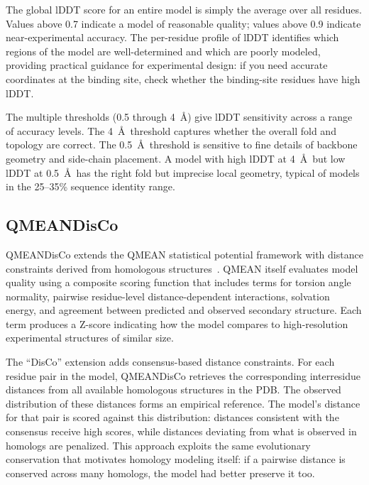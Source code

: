 The global lDDT score for an entire model is simply the average over all residues. Values above 0.7 indicate a model of reasonable quality; values above 0.9 indicate near-experimental accuracy. The per-residue profile of lDDT identifies which regions of the model are well-determined and which are poorly modeled, providing practical guidance for experimental design: if you need accurate coordinates at the binding site, check whether the binding-site residues have high lDDT.

The multiple thresholds (0.5 through 4~\AA) give lDDT sensitivity across a range of accuracy levels. The 4~\AA\ threshold captures whether the overall fold and topology are correct. The 0.5~\AA\ threshold is sensitive to fine details of backbone geometry and side-chain placement. A model with high lDDT at 4~\AA\ but low lDDT at 0.5~\AA\ has the right fold but imprecise local geometry, typical of models in the 25--35\% sequence identity range.

\subsection{QMEANDisCo}
\label{subsec:qmeandisco}

QMEANDisCo extends the QMEAN statistical potential framework with distance constraints derived from homologous structures~\cite{studer2020}. QMEAN itself evaluates model quality using a composite scoring function that includes terms for torsion angle normality, pairwise residue-level distance-dependent interactions, solvation energy, and agreement between predicted and observed secondary structure. Each term produces a Z-score indicating how the model compares to high-resolution experimental structures of similar size.

The ``DisCo'' extension adds consensus-based distance constraints. For each residue pair in the model, QMEANDisCo retrieves the corresponding interresidue distances from all available homologous structures in the PDB. The observed distribution of these distances forms an empirical reference. The model's distance for that pair is scored against this distribution: distances consistent with the consensus receive high scores, while distances deviating from what is observed in homologs are penalized. This approach exploits the same evolutionary conservation that motivates homology modeling itself: if a pairwise distance is conserved across many homologs, the model had better preserve it too.


